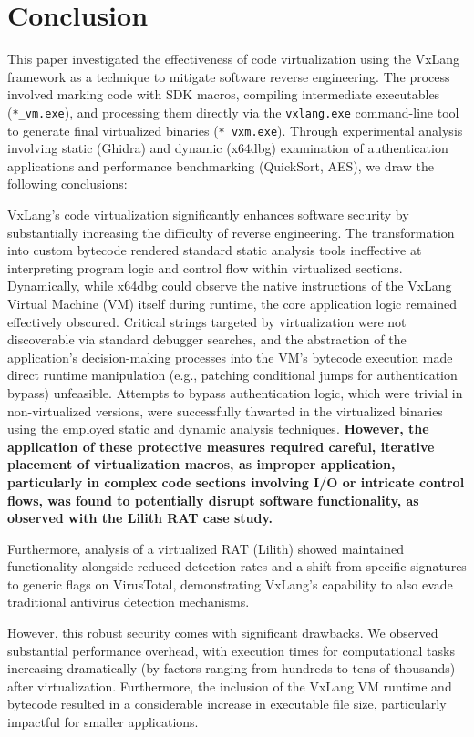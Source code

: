 \section{Conclusion} \label{sec:conclusion}
This paper investigated the effectiveness of code virtualization using the VxLang framework as a technique to mitigate software reverse engineering. The process involved marking code with SDK macros, compiling intermediate executables (\texttt{*\_vm.exe}), and processing them directly via the \texttt{vxlang.exe} command-line tool to generate final virtualized binaries (\texttt{*\_vxm.exe}). Through experimental analysis involving static (Ghidra) and dynamic (x64dbg) examination of authentication applications and performance benchmarking (QuickSort, AES), we draw the following conclusions:

VxLang's code virtualization significantly enhances software security by substantially increasing the difficulty of reverse engineering. The transformation into custom bytecode rendered standard static analysis tools ineffective at interpreting program logic and control flow within virtualized sections. Dynamically, while x64dbg could observe the native instructions of the VxLang Virtual Machine (VM) itself during runtime, the core application logic remained effectively obscured. Critical strings targeted by virtualization were not discoverable via standard debugger searches, and the abstraction of the application's decision-making processes into the VM's bytecode execution made direct runtime manipulation (e.g., patching conditional jumps for authentication bypass) unfeasible. Attempts to bypass authentication logic, which were trivial in non-virtualized versions, were successfully thwarted in the virtualized binaries using the employed static and dynamic analysis techniques. \textbf{However, the application of these protective measures required careful, iterative placement of virtualization macros, as improper application, particularly in complex code sections involving I/O or intricate control flows, was found to potentially disrupt software functionality, as observed with the Lilith RAT case study.}

Furthermore, analysis of a virtualized RAT (Lilith) showed maintained functionality alongside reduced detection rates and a shift from specific signatures to generic flags on VirusTotal, demonstrating VxLang's capability to also evade traditional antivirus detection mechanisms.

However, this robust security comes with significant drawbacks. We observed substantial performance overhead, with execution times for computational tasks increasing dramatically (by factors ranging from hundreds to tens of thousands) after virtualization. Furthermore, the inclusion of the VxLang VM runtime and bytecode resulted in a considerable increase in executable file size, particularly impactful for smaller applications.

